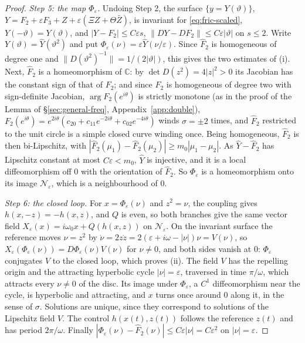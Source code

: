 \documentclass[11pt,reqno]{amsart}
\theoremstyle{plain}
\theoremstyle{definition}
\theoremstyle{remark}
\newcommand{\C}{\mathbb{C}}
\begin{document}
\begin{proof}
\emph{Step 5: the map $\Phi_\varepsilon$.} Undoing Step 2, the surface $\{y=Y(\vartheta)\}$,
$Y=F_2+\varepsilon F_3+Z+\varepsilon(\Xi Z+\Theta\bar Z)$, is invariant for \eqref{eq:fric-scaled}, $Y(-\vartheta)=Y(\vartheta)$, and
$|Y-F_2|\le C\varepsilon s$, $\|DY-DF_2\|\le C\varepsilon|\vartheta|$ on $s\le2$. Write $Y(\vartheta)=\hat Y(\vartheta^{2})$ and put
$\Phi_\varepsilon(\nu)=\varepsilon\hat Y(\nu/\varepsilon)$. Since $\hat F_2$ is homogeneous of degree one and
$\|D(\vartheta^{2})^{-1}\|=1/(2|\vartheta|)$, this gives the two estimates of (i). Next, $\hat F_2$ is a homeomorphism of $\C$: by
$\det D(z^{2})=4|z|^{2}>0$ its Jacobian has the constant sign of that of $F_2$; and since $F_2$ is homogeneous of degree
two with sign-definite Jacobian, $\arg F_2(e^{i\theta})$ is strictly monotone (as in the proof of the Lemma of
\S\ref{sec:general-freq}, Appendix~\ref{app:double}), $F_2(e^{i\theta})=e^{2i\theta}(c_{20}+c_{11}e^{-2i\theta}+c_{02}e^{-4i\theta})$ winds $\sigma=\pm2$ times, and
$\hat F_2$ restricted to the unit circle is a simple closed curve winding once. Being homogeneous, $\hat F_2$ is then
bi-Lipschitz, with $|\hat F_2(\mu_1)-\hat F_2(\mu_2)|\ge m_0|\mu_1-\mu_2|$. As $\hat Y-\hat F_2$ has Lipschitz constant at most
$C\varepsilon<m_0$, $\hat Y$ is injective, and it is a local diffeomorphism off $0$ with the orientation of $\hat F_2$. So
$\Phi_\varepsilon$ is a homeomorphism onto its image $\mathcal N_\varepsilon$, which is a neighbourhood of $0$.

\emph{Step 6: the closed loop.} For $x=\Phi_\varepsilon(\nu)$ and $z^{2}=\nu$, the coupling gives $h(x,-z)=-h(x,z)$, and $Q$
is even, so both branches give the same vector field $X_\varepsilon(x)=i\omega_0x+Q(h(x,z))$ on $\mathcal N_\varepsilon$. On the
invariant surface the reference moves $\nu=z^{2}$ by $\dot\nu=2z\dot z=2(\varepsilon+i\omega-|\nu|)\nu=V(\nu)$, so
$X_\varepsilon(\Phi_\varepsilon(\nu))=D\Phi_\varepsilon(\nu)V(\nu)$ for $\nu\ne0$, and both sides vanish at $0$: $\Phi_\varepsilon$ conjugates $V$ to
the closed loop, which proves (ii). The field $V$ has the repelling origin and the attracting hyperbolic cycle
$|\nu|=\varepsilon$, traversed in time $\pi/\omega$, which attracts every $\nu\ne0$ of the disc. Its image under $\Phi_\varepsilon$, a
$C^{1}$ diffeomorphism near the cycle, is hyperbolic and attracting, and $x$ turns once around $0$ along it, in the
sense of $\sigma$. Solutions are unique, since they correspond to solutions of the Lipschitz field $V$. The control
$h(x(t),z(t))$ follows the reference $z(t)$ and has period $2\pi/\omega$. Finally
$|\Phi_\varepsilon(\nu)-\hat F_2(\nu)|\le C\varepsilon|\nu|=C\varepsilon^{2}$ on $|\nu|=\varepsilon$.
\end{proof}
\end{document}
